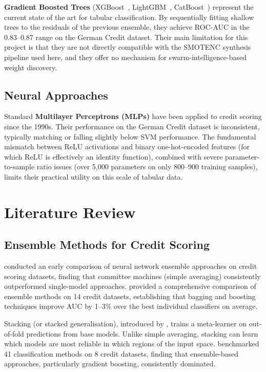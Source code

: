 \documentclass[12pt,a4paper]{article}
\begin{document}
\textbf{Gradient Boosted Trees} (XGBoost~\citep{chen2016xgboost}, LightGBM~\citep{ke2017lightgbm}, CatBoost~\citep{prokhorenkova2018catboost}) represent the current state of the art for tabular classification. By sequentially fitting shallow trees to the residuals of the previous ensemble, they achieve ROC-AUC in the 0.83--0.87 range on the German Credit dataset. Their main limitation for this project is that they are not directly compatible with the SMOTENC synthesis pipeline used here, and they offer no mechanism for swarm-intelligence-based weight discovery.

\subsection{Neural Approaches}

Standard \textbf{Multilayer Perceptrons (MLPs)} have been applied to credit scoring since the 1990s. Their performance on the German Credit dataset is inconsistent, typically matching or falling slightly below SVM performance. The fundamental mismatch between ReLU activations and binary one-hot-encoded features (for which ReLU is effectively an identity function), combined with severe parameter-to-sample ratio issues (over 5,000 parameters on only 800--900 training samples), limits their practical utility on this scale of tabular data.

\pagebreak
\section{Literature Review}

\subsection{Ensemble Methods for Credit Scoring}

\citet{west2000neural} conducted an early comparison of neural network ensemble approaches on credit scoring datasets, finding that committee machines (simple averaging) consistently outperformed single-model approaches. \citet{brown2012experimental} provided a comprehensive comparison of ensemble methods on 14 credit datasets, establishing that bagging and boosting techniques improve AUC by 1--3\% over the best individual classifiers on average.

Stacking (or stacked generalisation), introduced by \citet{wolpert1992stacked}, trains a meta-learner on out-of-fold predictions from base models. Unlike simple averaging, stacking can learn which models are most reliable in which regions of the input space. \citet{lessmann2015benchmarking} benchmarked 41 classification methods on 8 credit datasets, finding that ensemble-based approaches, particularly gradient boosting, consistently dominated.
\end{document}

